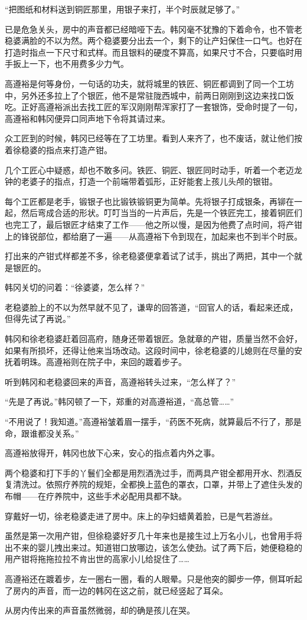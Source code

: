 “把图纸和材料送到铜匠那里，用银子来打，半个时辰就足够了。”

已是危急关头，房中的声音都已经暗哑下去。韩冈毫不犹豫的下着命令，也不管老稳婆满脸的不以为然。两个稳婆要分出去一个，剩下的让产妇保住一口气。也好在打造时指点一下尺寸和式样。而且银料的硬度不算高，如果尺寸不合，只要临时用手扳上一下，也不用费多少力气。

高遵裕是何等身份，一句话的功夫，就将城里的铁匠、铜匠都调到了同一个工坊中，另外还多拉上了个银匠，他不是常驻陇西城中，前两日刚刚到这边来找口饭吃。正好高遵裕派出去找工匠的军汉刚刚帮浑家打了一套银饰，受命时提了一句，高遵裕和韩冈便异口同声地下令将其请过来。

众工匠到的时候，韩冈已经等在了工坊里。看到人来齐了，也不废话，就让他们按着徐稳婆的指点来打造产钳。

几个工匠心中疑惑，却也不敢多问。铁匠、铜匠、银匠同时动手，听着一个老迈龙钟的老婆子的指点，打造一个前端带着弧形，正好能套上孩儿头颅的银钳。

每个工匠都是老手，锻银子也比锻铁锻铜更为简单。先将银子打成银条，再铆在一起，然后弯成合适的形状。叮叮当当的一片声后，先是一个铁匠完工，接着铜匠们也完工了，最后银匠才结束了工作——他之所以慢，是因为他费了点时间，将产钳上的锋锐部位，都给磨了一遍——从高遵裕下令到现在，加起来也不到半个时辰。

打出来的产钳式样都差不多，徐老稳婆便拿着试了试手，挑出了两把，其中一个就是银匠的。

韩冈关切的问着：“徐婆婆，怎么样？”

老稳婆脸上的不以为然早就不见了，谦卑的回答道，“回官人的话，看起来还成，但得先试了再说。”

韩冈和徐老稳婆赶着回高府，随身还带着银匠。急就章的产钳，质量当然不会好，如果有所损坏，还得让他来当场改动。这段时间中，徐老稳婆的儿媳则在尽量的安抚着明珠。高遵裕则在院子中，来回的踱着步子。

听到韩冈和老稳婆回来的声音，高遵裕转头过来，“怎么样了？”

“先是了再说。”韩冈顿了一下，郑重的对高遵裕道，“高总管……”

“不用说了！我知道。”高遵裕皱着眉一摆手，“药医不死病，就算最后不行了，那是命，跟谁都没关系。”

高遵裕放得开，韩冈也放下心来，安心的指点着内外之事。

两个稳婆和打下手的丫鬟们全都是用烈酒洗过手，而两具产钳全都用开水、烈酒反复清洗过。依照疗养院的规矩，全都换上蓝色的罩衣，口罩，并带上了遮住头发的布帽——在疗养院中，这些手术必配用具都不缺。

穿戴好一切，徐老稳婆走进了房中。床上的孕妇蜡黄着脸，已是气若游丝。

虽然是第一次用产钳，但徐稳婆好歹几十年来也是接生过上万名小儿，也曾用手将出不来的婴儿拽出来过。知道钳口放哪边，该怎么使劲。试了两下后，她便稳稳的用产钳将拖拖拉拉不肯出世的高家小儿给捉住了……

高遵裕还在踱着步，左一圈右一圈，看的人眼晕。只是他突的脚步一停，侧耳听起了房内的声音，而一边的韩冈在这之前，就已经竖起了耳朵。

从房内传出来的声音虽然微弱，却的确是孩儿在哭。

